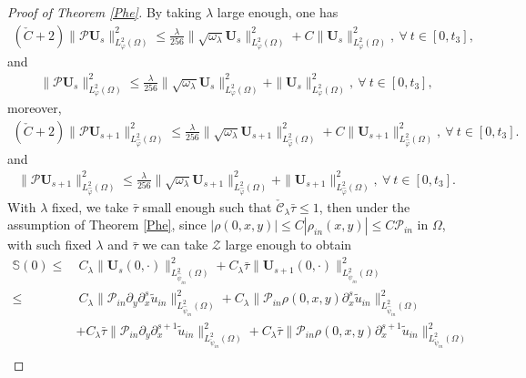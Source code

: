 \documentclass{amsart}
\numberwithin{equation}{section}
\begin{document}
\begin{proof}[Proof of Theorem \ref{Phe}]
By taking $\lambda$ large enough, one has
\begin{align*}
(\check{C}+2)\|\mathcal{P}\mathbf{U}_{s}\|_{L_{\varphi}^{2}(\Omega)}^{2}
\leq \frac{\lambda}{256}\|\sqrt{\omega_{\lambda}}\mathbf{U}_{s}\|_{L_{\varphi}^{2}(\Omega)}^{2}
    +C\|\mathbf{U}_{s}\|_{L_{\varphi}^{2}(\Omega)}^{2},~\forall~t\in[0,t_{3}],
\end{align*}
and
\begin{align}\label{pus}
\|\mathcal{P}\mathbf{U}_{s}\|_{L_{\varphi}^{2}(\Omega)}^{2}
\leq \frac{\lambda}{256}\|\sqrt{\omega_{\lambda}}\mathbf{U}_{s}\|_{L_{\varphi}^{2}(\Omega)}^{2}
    +\|\mathbf{U}_{s}\|_{L_{\varphi}^{2}(\Omega)}^{2},   ~\forall~t\in[0,t_{3}],
\end{align}
moreover,
\begin{align*}
(\check{C}+2)\|\mathcal{P}\mathbf{U}_{s+1}\|_{L_{\hat{\varphi}}^{2}(\Omega)}^{2}
\leq \frac{\lambda}{256}\|\sqrt{\omega_{\lambda}}\mathbf{U}_{s+1}\|_{L_{\hat{\varphi}}^{2}(\Omega)}^{2}
    +C\|\mathbf{U}_{s+1}\|_{L_{\hat{\varphi}}^{2}(\Omega)}^{2},~\forall~t\in[0,t_{3}].
\end{align*}
and
\begin{align}\label{pus+1}
\|\mathcal{P}\mathbf{U}_{s+1}\|_{L_{\hat{\varphi}}^{2}(\Omega)}^{2}
\leq \frac{\lambda}{256}\|\sqrt{\omega_{\lambda}}\mathbf{U}_{s+1}\|_{L_{\hat{\varphi}}^{2}(\Omega)}^{2}
    +\|\mathbf{U}_{s+1}\|_{L_{\hat{\varphi}}^{2}(\Omega)}^{2},~\forall~t\in[0,t_{3}].
\end{align}
With $\lambda$ fixed, we take $\bar{\tau}$ small enough such that $\check{\mathcal{C}}_{\lambda}\bar{\tau}\leq1$, then under the assumption of Theorem \ref{Phe}, since $|\rho(0,x,y)|\leq C|\rho_{in}(x,y)|\leq C\mathcal{P}_{in}$ in $\Omega$, with such fixed $\lambda$ and $\bar{\tau}$ we can take $\mathcal{Z}$ large enough to obtain
\begin{align}\label{ine}
\mathbb{S}(0)
\leq&~C_{\lambda}\|\mathbf{U}_{s}(0,\cdot)\|_{L_{\hat{\psi}_{in}}^{2}(\Omega)}^{2}
     +C_{\lambda}\bar{\tau}\|\mathbf{U}_{s+1}(0,\cdot)\|_{L_{\check{\psi}_{in}}^{2}(\Omega)}^{2}\\
\leq&~C_{\lambda}\|\mathcal{P}_{in}\partial_{y}\partial_{x}^{s}\tilde{u}_{in}\|_{L_{\hat{\psi}_{in}}^{2}(\Omega)}^{2}
     +C_{\lambda}\|\mathcal{P}_{in}\rho(0,x,y)\partial_{x}^{s}\tilde{u}_{in}\|_{L_{\hat{\psi}_{in}}^{2}(\Omega)}^{2}\nonumber\\
    &+C_{\lambda}\bar{\tau}\|\mathcal{P}_{in}\partial_{y}\partial_{x}^{s+1}\tilde{u}_{in}\|_{L_{\check{\psi}_{in}}^{2}(\Omega)}^{2}
     +C_{\lambda}\bar{\tau}\|\mathcal{P}_{in}\rho(0,x,y)\partial_{x}^{s+1}\tilde{u}_{in}\|_{L_{\check{\psi}_{in}}^{2}(\Omega)}^{2}\nonumber\\

\end{align}
\end{proof}
\end{document}
